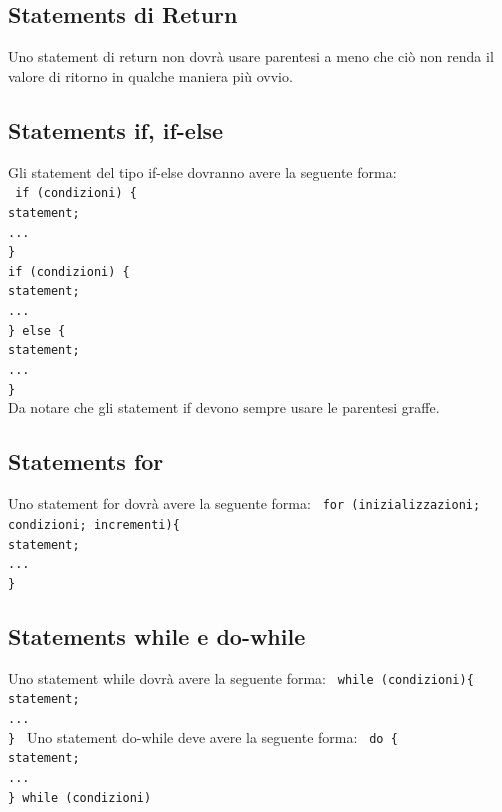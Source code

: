 \documentclass[11pt,titlepage,a4paper]{report}
\begin{document}
\subsection{Statements di Return}
Uno statement di return non dovr\`a usare parentesi a meno che ci\`o non renda il valore di ritorno in qualche maniera pi\`u ovvio.
\subsection{Statements if, if-else}
Gli statement del tipo if-else dovranno avere la seguente forma:\\
\texttt{
	 \newline
	if (condizioni) \{ \\
	\phantom{....}statement;\\
	\phantom{....}... \\
	\}
	\\
	\newline
	\newline
	if (condizioni) \{ \\
	\phantom{....}statement;\\
	\phantom{....}... \\
	\} else \{\\
	\phantom{....}statement;\\
	\phantom{....}... \\
	\}
	\\
	\newline
}
Da notare che gli statement if devono sempre usare le parentesi graffe.
\subsection{Statements for}
Uno statement for dovr\`a avere la seguente forma: \newline
\texttt{
	 \newline
	for (inizializzazioni; condizioni; incrementi)\{ \\
	\phantom{....}statement;\\
	\phantom{....}... \\
	\}
}
\subsection{Statements while e do-while}
Uno statement while dovr\`a avere la seguente forma:\newline
\texttt{
	 \newline
	while (condizioni)\{ \\
	\phantom{....}statement;\\
	\phantom{....}... \\
	\}
}\newline
 \newline
Uno statement do-while deve avere la seguente forma: \newline
\texttt{
	 \newline
	do \{ \\
	\phantom{....}statement;\\
	\phantom{....}... \\
	\} while (condizioni)
}
\end{document}
